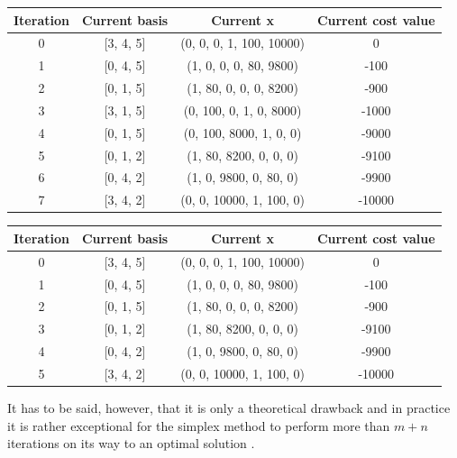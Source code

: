 \documentclass[a4paper,10 pt,titlepage,twoside]{report}
\theoremstyle{plain}
\theoremstyle{definition}
\theoremstyle{remark}
\begin{document}
\begin{table}[h]
	\begin{center}
	\begin{tabular}{|c|c|c|c|}
		\hline
		\textbf{Iteration} & \textbf{Current basis} & \textbf{Current x} & \textbf{Current cost value} \\ \hline
		0 & [3, 4, 5] & (0, 0, 0, 1, 100, 10000) & 0 \\ 
		1 & [0, 4, 5] & (1, 0, 0, 0, 80, 9800) & -100 \\
		2 & [0, 1, 5] & (1, 80, 0, 0, 0, 8200) & -900 \\
		3 & [3, 1, 5] & (0, 100, 0, 1, 0, 8000) & -1000 \\ 
		4 & [0, 1, 5] & (0, 100, 8000, 1, 0, 0) & -9000 \\ 
		5 & [0, 1, 2] & (1, 80, 8200, 0, 0, 0) & -9100 \\
		6 & [0, 4, 2] & (1, 0, 9800, 0, 80, 0) & -9900 \\ 
		7 & [3, 4, 2] & (0, 0, 10000, 1, 100, 0) & -10000 \\ \hline
	\end{tabular}
\end{center}
\end{table}

\begin{table}[h]
	\begin{center}
		\begin{tabular}{|c|c|c|c|}
			\hline
			\textbf{Iteration} & \textbf{Current basis} & \textbf{Current x} & \textbf{Current cost value} \\ \hline
			0 & [3, 4, 5] & (0, 0, 0, 1, 100, 10000) & 0 \\
			1 & [0, 4, 5] & (1, 0, 0, 0, 80, 9800) & -100 \\
			2 & [0, 1, 5] & (1, 80, 0, 0, 0, 8200) & -900 \\
			3 & [0, 1, 2] & (1, 80, 8200, 0, 0, 0) & -9100 \\
			4 & [0, 4, 2] & (1, 0, 9800, 0, 80, 0) & -9900 \\
			5 & [3, 4, 2] & (0, 0, 10000, 1, 100, 0) & -10000 \\ \hline
		\end{tabular}
	\end{center}
\end{table}

It has to be said, however, that it is only a theoretical drawback and in practice it is rather exceptional for the simplex method to perform more than $m + n$ iterations on its way to an optimal solution \cite{ComTeq}.
\\
\end{document}
